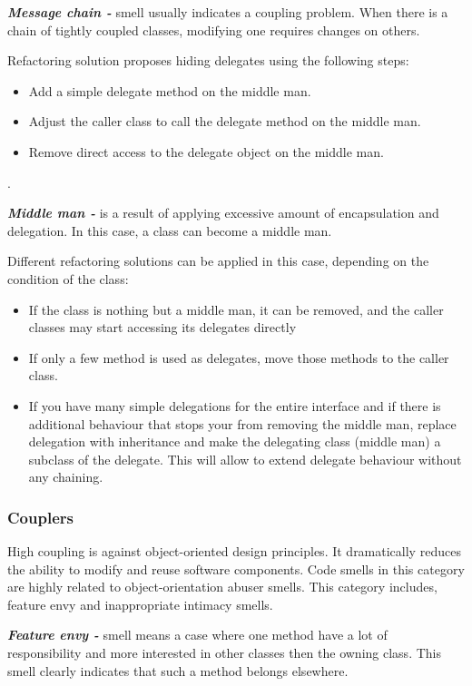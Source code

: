 \textit{\textbf{Message chain -}} smell usually indicates a coupling problem. When there is a chain of tightly coupled classes, modifying one requires changes on others.

Refactoring solution proposes hiding delegates using the following steps:

\begin{itemize}
\item Add a simple delegate method on the middle man. 
\item Adjust the caller class to call the delegate method on the middle man.
\item Remove direct access to the delegate object on the middle man.
\end{itemize}. 
 
\textit{\textbf{Middle man -}} is a result of applying excessive amount of encapsulation and delegation. In this case, a class can become a middle man.

Different refactoring solutions can be applied in this case, depending on the condition of the class:

\begin{itemize}
\item If the class is nothing but a middle man, it can be removed, and the caller classes may start accessing its delegates directly
\item If only a few method is used as delegates, move those methods to the caller class.
\item If you have many simple delegations for the entire interface and if there is additional behaviour that stops your from removing the middle man, replace delegation with inheritance and make the delegating class (middle man) a subclass of the delegate. This will allow to extend delegate behaviour without any chaining.
\end{itemize} 

\subsubsection*{Couplers}
High coupling is against object-oriented design principles. It dramatically reduces the ability to modify and reuse software components. Code smells in this category are highly related to object-orientation abuser smells. This category includes, feature envy and inappropriate intimacy smells.

\textit{\textbf{Feature envy -}} smell means a case where one method have a lot of responsibility and more interested in other classes then the owning class. This smell clearly indicates that such a method belongs elsewhere. 

